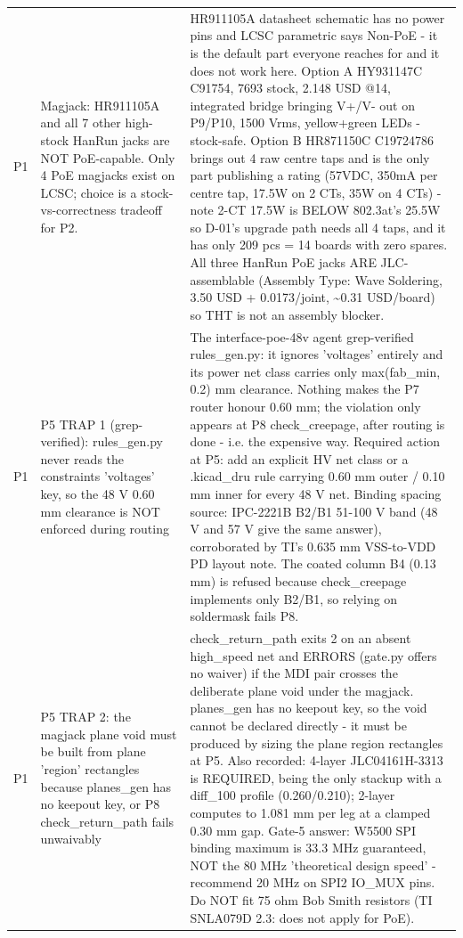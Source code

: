 \documentclass[11pt,a4paper]{article}
\begin{document}
{\begin{longtable}{lp{5.2cm}p{7.2cm}}
P1 & Magjack: HR911105A and all 7 other high-stock HanRun jacks are NOT PoE-capable. Only 4 PoE magjacks exist on LCSC; choice is a stock-vs-correctness tradeoff for P2. & HR911105A datasheet schematic has no power pins and LCSC parametric says Non-PoE - it is the default part everyone reaches for and it does not work here. Option A HY931147C C91754, 7693 stock, 2.148 USD @14, integrated bridge bringing V+/V- out on P9/P10, 1500 Vrms, yellow+green LEDs - stock-safe. Option B HR871150C C19724786 brings out 4 raw centre taps and is the only part publishing a rating (57VDC, 350mA per centre tap, 17.5W on 2 CTs, 35W on 4 CTs) - note 2-CT 17.5W is BELOW 802.3at's 25.5W so D-01's upgrade path needs all 4 taps, and it has only 209 pcs = 14 boards with zero spares. All three HanRun PoE jacks ARE JLC-assemblable (Assembly Type: Wave Soldering, 3.50 USD + 0.0173/joint, \textasciitilde{}0.31 USD/board) so THT is not an assembly blocker. \\
P1 & P5 TRAP 1 (grep-verified): rules\_gen.py never reads the constraints 'voltages' key, so the 48 V 0.60 mm clearance is NOT enforced during routing & The interface-poe-48v agent grep-verified rules\_gen.py: it ignores 'voltages' entirely and its power net class carries only max(fab\_min, 0.2) mm clearance. Nothing makes the P7 router honour 0.60 mm; the violation only appears at P8 check\_creepage, after routing is done - i.e. the expensive way. Required action at P5: add an explicit HV net class or a .kicad\_dru rule carrying 0.60 mm outer / 0.10 mm inner for every 48 V net. Binding spacing source: IPC-2221B B2/B1 51-100 V band (48 V and 57 V give the same answer), corroborated by TI's 0.635 mm VSS-to-VDD PD layout note. The coated column B4 (0.13 mm) is refused because check\_creepage implements only B2/B1, so relying on soldermask fails P8. \\
P1 & P5 TRAP 2: the magjack plane void must be built from plane 'region' rectangles because planes\_gen has no keepout key, or P8 check\_return\_path fails unwaivably & check\_return\_path exits 2 on an absent high\_speed net and ERRORS (gate.py offers no waiver) if the MDI pair crosses the deliberate plane void under the magjack. planes\_gen has no keepout key, so the void cannot be declared directly - it must be produced by sizing the plane region rectangles at P5. Also recorded: 4-layer JLC04161H-3313 is REQUIRED, being the only stackup with a diff\_100 profile (0.260/0.210); 2-layer computes to 1.081 mm per leg at a clamped 0.30 mm gap. Gate-5 answer: W5500 SPI binding maximum is 33.3 MHz guaranteed, NOT the 80 MHz 'theoretical design speed' - recommend 20 MHz on SPI2 IO\_MUX pins. Do NOT fit 75 ohm Bob Smith resistors (TI SNLA079D 2.3: does not apply for PoE). \\

\end{longtable}}
\end{document}
